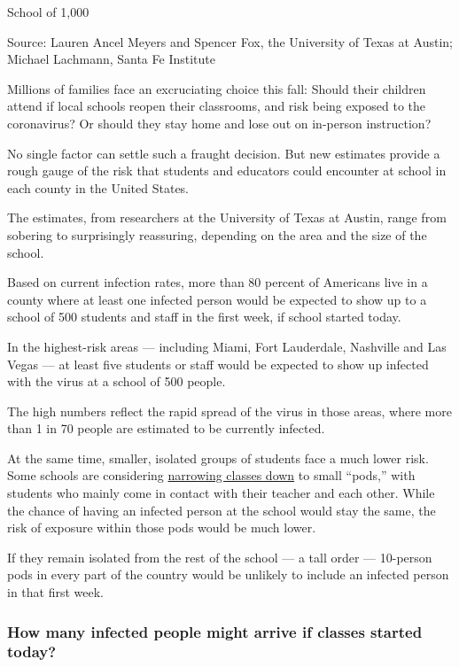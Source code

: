 School of 1,000

Source: Lauren Ancel Meyers and Spencer Fox, the University of Texas at
Austin; Michael Lachmann, Santa Fe Institute

Millions of families face an excruciating choice this fall: Should their
children attend if local schools reopen their classrooms, and risk being
exposed to the coronavirus? Or should they stay home and lose out on
in-person instruction?

No single factor can settle such a fraught decision. But new estimates
provide a rough gauge of the risk that students and educators could
encounter at school in each county in the United States.

The estimates, from researchers at the University of Texas at Austin,
range from sobering to surprisingly reassuring, depending on the area
and the size of the school.

Based on current infection rates, more than 80 percent of Americans live
in a county where at least one infected person would be expected to show
up to a school of 500 students and staff in the first week, if school
started today.

In the highest-risk areas --- including Miami, Fort Lauderdale,
Nashville and Las Vegas --- at least five students or staff would be
expected to show up infected with the virus at a school of 500 people.

The high numbers reflect the rapid spread of the virus in those areas,
where more than 1 in 70 people are estimated to be currently infected.

At the same time, smaller, isolated groups of students face a much lower
risk. Some schools are considering
\href{https://www.nytimes.com/interactive/2020/07/29/us/schools-reopening-coronavirus.html}{narrowing
classes down} to small ``pods,'' with students who mainly come in
contact with their teacher and each other. While the chance of having an
infected person at the school would stay the same, the risk of exposure
within those pods would be much lower.

If they remain isolated from the rest of the school --- a tall order ---
10-person pods in every part of the country would be unlikely to include
an infected person in that first week.

\hypertarget{how-many-infected-people-might-arrive-if-classes-started-today}{%
\subsubsection{How many infected people might arrive if classes started
today?}\label{how-many-infected-people-might-arrive-if-classes-started-today}}

